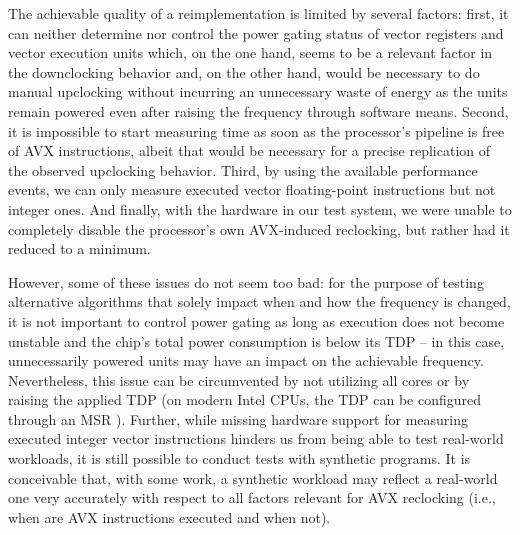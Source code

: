 The achievable quality of a reimplementation is limited by several factors: first, it can neither determine nor control the power gating status of vector registers and vector execution units which, on the one hand, seems to be a relevant factor in the downclocking behavior and, on the other hand, would be necessary to do manual upclocking without incurring an unnecessary waste of energy as the units remain powered even after raising the frequency through software means. Second, it is impossible to start measuring time as soon as the processor's pipeline is free of \gls{AVX} instructions, albeit that would be necessary for a precise replication of the observed upclocking behavior. Third, by using the available performance events, we can only measure executed vector floating-point instructions but not integer ones. And finally, with the hardware in our test system, we were unable to completely disable the processor's own \gls{AVX}-induced reclocking, but rather had it reduced to a minimum.

However, some of these issues do not seem too bad: for the purpose of testing alternative algorithms that solely impact when and how the frequency is changed, it is not important to control power gating as long as execution does not become unstable and the chip's total power consumption is below its \gls{TDP} -- in this case, unnecessarily powered units may have an impact on the achievable frequency. Nevertheless, this issue can be circumvented by not utilizing all cores or by raising the applied \gls{TDP} (on modern Intel \glspl{CPU}, the \gls{TDP} can be configured through an \gls{MSR} \cite{intelsdmsysprogguide}). Further, while missing hardware support for measuring executed integer vector instructions hinders us from being able to test real-world workloads, it is still possible to conduct tests with synthetic programs. It is conceivable that, with some work, a synthetic workload may reflect a real-world one very accurately with respect to all factors relevant for \gls{AVX} reclocking (i.e., when are \gls{AVX} instructions executed and when not).

